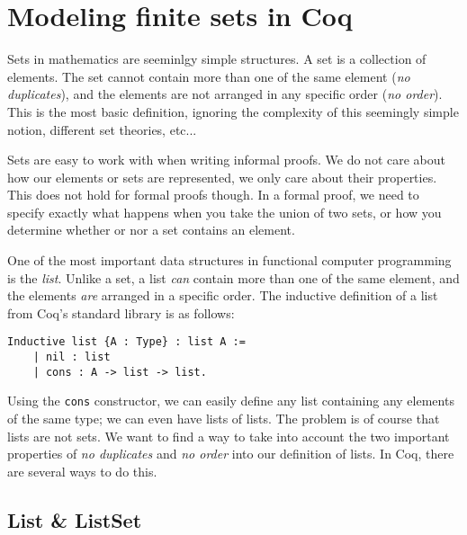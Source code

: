 \section{Modeling finite sets in Coq}

Sets in mathematics are seeminlgy simple structures.
A set is a collection of elements.
The set cannot contain more than one of the same element (\textit{no duplicates}), and the elements are not arranged in any
specific order (\textit{no order}).
This is the most basic definition, ignoring the complexity of this seemingly simple notion, different set theories, etc...

Sets are easy to work with when writing informal proofs.
We do not care about how our elements or sets are represented, we only care about their properties.
This does not hold for formal proofs though. In a formal proof, we need to specify exactly what happens
when you take the union of two sets, or how you determine whether or nor a set contains an element.

One of the most important data structures in functional computer programming is the \textit{list}.
Unlike a set, a list \textit{can} contain more than one of the same element, and the elements \textit{are} arranged in a
specific order.
The inductive definition of a list from Coq's standard library is as follows:

\begin{minipage}{\linewidth}
\begin{lstlisting}[language=Coq, label={lst:list_def}, caption={Inductive def. of list type in Coq}]
Inductive list {A : Type} : list A :=
    | nil : list
    | cons : A -> list -> list.
\end{lstlisting}
\end{minipage}

Using the \lstinline{cons} constructor, we can easily define any list containing any elements of the same type;
we can even have lists of lists.
The problem is of course that lists are not sets. We want to find a way to take into account the two important properties
of \textit{no duplicates} and \textit{no order} into our definition of lists.
In Coq, there are several ways to do this.


\subsection{List \& ListSet}

